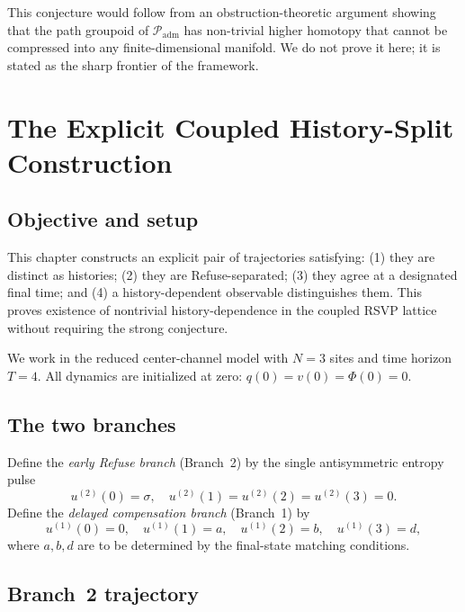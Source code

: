 \documentclass[12pt, oneside]{memoir}
\newcommand{\Padm}{\mathcal{P}_{\mathrm{adm}}}
\begin{document}
This conjecture would follow from an obstruction-theoretic argument showing that the
path groupoid of $\Padm$ has non-trivial higher homotopy that cannot be compressed into
any finite-dimensional manifold.  We do not prove it here; it is stated as the sharp
frontier of the framework.

\chapter{The Explicit Coupled History-Split Construction}
\label{ch:split}

\section{Objective and setup}

This chapter constructs an explicit pair of trajectories satisfying: (1) they are
distinct as histories; (2) they are Refuse-separated; (3) they agree at a designated
final time; and (4) a history-dependent observable distinguishes them.  This proves
existence of nontrivial history-dependence in the coupled RSVP lattice without requiring
the strong conjecture.

We work in the reduced center-channel model
 with $N=3$ sites and time horizon $T=4$.  All dynamics
are initialized at zero: $q(0) = v(0) = \Phi(0) = 0$.

\section{The two branches}

\begin{definition}
\label{def:branches}
Define the \emph{early Refuse branch} (Branch~2) by the single antisymmetric entropy
pulse
\[
  u^{(2)}(0) = \sigma, \quad u^{(2)}(1) = u^{(2)}(2) = u^{(2)}(3) = 0.
\]
Define the \emph{delayed compensation branch} (Branch~1) by
\[
  u^{(1)}(0) = 0, \quad
  u^{(1)}(1) = a, \quad
  u^{(1)}(2) = b, \quad
  u^{(1)}(3) = d,
\]
where $a, b, d$ are to be determined by the final-state matching conditions.
\end{definition}

\section{Branch~2 trajectory}
\end{document}
